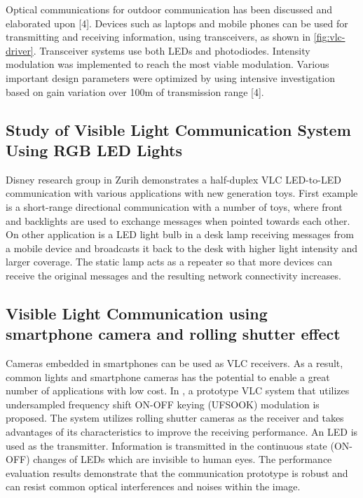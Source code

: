 Optical communications for outdoor communication has been discussed and elaborated
upon [4]. Devices such as laptops and mobile phones can be used for transmitting and
receiving information, using transceivers, as shown in \ref{fig:vlc-driver}. Transceiver systems use
both LEDs and photodiodes. Intensity modulation was implemented to reach the most
viable modulation. Various important design parameters were optimized by using
intensive investigation based on gain variation over 100m of transmission range [4]. 

\subsection{Study of Visible Light Communication System Using RGB LED Lights}

Disney research group in Zurih {\citep{disney}} demonstrates a half-duplex VLC LED-to-LED communication with various applications with new generation toys.
First example is a short-range directional communication with
a number of toys, where front and backlights are used to exchange
messages when pointed towards each other. On other application is a LED light bulb in a desk lamp receiving
messages from a mobile device and broadcasts it back to the desk
with higher light intensity and larger coverage. The static lamp acts
as a repeater so that more devices can receive the original messages
and the resulting network connectivity increases.

\subsection{Visible Light Communication using smartphone camera and rolling shutter effect}

Cameras embedded in smartphones can be used as VLC receivers. As a result, common lights and smartphone cameras has the potential to enable a great number
of applications with low cost. In \citep{rolling}, a prototype VLC
system that utilizes undersampled frequency shift ON-OFF keying (UFSOOK) modulation is proposed. The system utilizes rolling shutter cameras as the receiver and takes advantages of its characteristics to improve the receiving performance. An LED is used as the transmitter.
Information is transmitted in the continuous state (ON-OFF) changes of LEDs which are invisible to human eyes. 
The performance evaluation results demonstrate that the communication prototype is robust and can resist common optical interferences and noises within the image.

